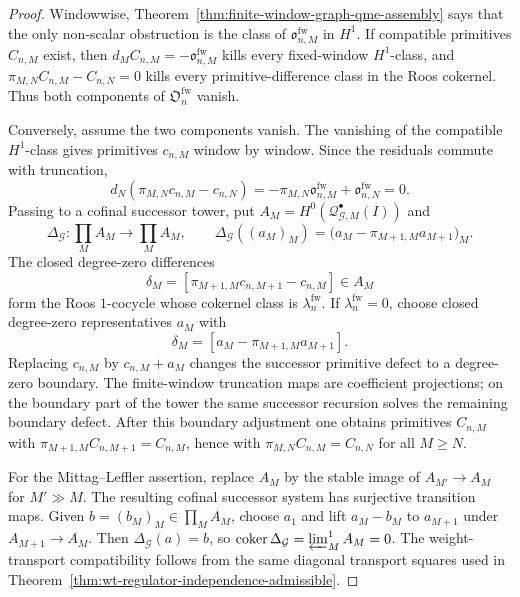\begin{proof}
  Windowwise, Theorem~\ref{thm:finite-window-graph-qme-assembly} says that
  the only non-scalar obstruction is the class of
  \(\mathfrak o^{\mathrm{fw}}_{n,M}\) in \(H^1\).  If compatible
  primitives \(C_{n,M}\) exist, then
  \(d_MC_{n,M}=-\mathfrak o^{\mathrm{fw}}_{n,M}\) kills every fixed-window
  \(H^1\)-class, and
  \(\pi_{M,N}C_{n,M}-C_{n,N}=0\) kills every primitive-difference class in
  the Roos cokernel.  Thus both components of
  \(\mathfrak O^{\mathrm{fw}}_n\) vanish.

  Conversely, assume the two components vanish.  The vanishing of the
  compatible \(H^1\)-class gives primitives \(c_{n,M}\) window by window.
  Since the residuals commute with truncation,
  \[
    d_N(\pi_{M,N}c_{n,M}-c_{n,N})
      =
    -\pi_{M,N}\mathfrak o^{\mathrm{fw}}_{n,M}
      +\mathfrak o^{\mathrm{fw}}_{n,N}
      =0 .
  \]
  Passing to a cofinal successor tower, put
  \(A_M=H^0(\mathcal Q^\bullet_{\mathcal G,M}(I))\) and
  \[
    \Delta_{\mathcal G}\colon\prod_M A_M\longrightarrow\prod_M A_M,
    \qquad
    \Delta_{\mathcal G}((a_M)_M)
      =\bigl(a_M-\pi_{M+1,M}a_{M+1}\bigr)_M .
  \]
  The closed degree-zero differences
  \[
    \delta_M
      =
    [\pi_{M+1,M}c_{n,M+1}-c_{n,M}]\in A_M
  \]
  form the Roos \(1\)-cocycle whose cokernel class is
  \(\lambda^{\mathrm{fw}}_n\).  If
  \(\lambda^{\mathrm{fw}}_n=0\), choose closed degree-zero representatives
  \(a_M\) with
  \[
    \delta_M=[a_M-\pi_{M+1,M}a_{M+1}].
  \]
  Replacing \(c_{n,M}\) by \(c_{n,M}+a_M\) changes the successor
  primitive defect to a degree-zero boundary.  The finite-window
  truncation maps are coefficient projections; on the boundary part of the
  tower the same successor recursion solves the remaining boundary
  defect.  After this boundary adjustment one obtains primitives
  \(C_{n,M}\) with
  \(\pi_{M+1,M}C_{n,M+1}=C_{n,M}\), hence with
  \(\pi_{M,N}C_{n,M}=C_{n,N}\) for all \(M\geq N\).

  For the Mittag--Leffler assertion, replace \(A_M\) by the stable image
  of \(A_{M'}\to A_M\) for \(M'\gg M\).  The resulting cofinal successor
  system has surjective transition maps.  Given
  \(b=(b_M)_M\in\prod_M A_M\), choose \(a_1\) and lift
  \(a_M-b_M\) to \(a_{M+1}\) under \(A_{M+1}\to A_M\).  Then
  \(\Delta_{\mathcal G}(a)=b\), so
  \(\operatorname{coker}\Delta_{\mathcal G}
    =\varprojlim^1_MA_M=0\).  The weight-transport compatibility follows
  from the same diagonal transport squares used in
  Theorem~\ref{thm:wt-regulator-independence-admissible}.
\end{proof}

